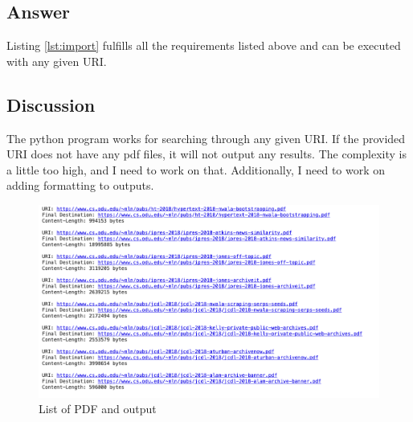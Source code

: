 \documentclass[12pt]{article}
\begin{document}
\subsection*{Answer}
Listing \ref{lst:import} fulfills all the requirements listed above and can be executed with any given URI.



\subsection*{Discussion}

The python program works for searching through any given URI. If the provided URI does not have any pdf files, it will not output any results.  The complexity is a little too high, and I need to work on that. Additionally, I need to work on adding formatting to outputs.

\begin{figure}[h!]
    \centering
    \includegraphics[clip, width=\textwidth] {pdf-1}
    \caption{List of PDF and output}
    \label{fig:p1}
\end{figure}

\end{document}
